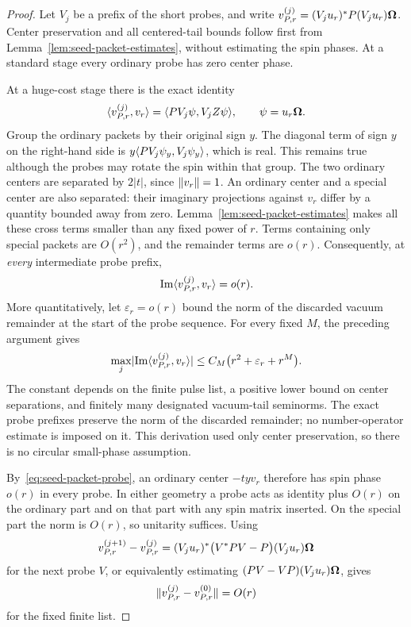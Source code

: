 \begin{proof}
Let \(V_j\) be a prefix of the short probes, and write
\(v_{P,r}^{(j)}=(V_ju_r)^*P(V_ju_r)\boldsymbol\Omega\).  Center preservation and
all centered-tail bounds follow first from
Lemma~\ref{lem:seed-packet-estimates}, without estimating the spin
phases.  At a standard stage every ordinary probe has zero center phase.

At a huge-cost stage there is the exact identity
\begin{equation}
\label{eq:seed-hermitian-diagonal}
 \langle v_{P,r}^{(j)},v_r\rangle
 =\langle PV_j\psi,V_jZ\psi\rangle,\qquad \psi=u_r\boldsymbol\Omega.
\end{equation}
Group the ordinary packets by their original sign \(y\).  The diagonal
term of sign \(y\) on the right-hand side is
\(y\langle PV_j\psi_y,V_j\psi_y\rangle\), which is real.  This remains true
although the probes may rotate the spin within that group.  The two
ordinary centers are separated by \(2|t|\), since \(\lVert v_r\rVert=1\).
An ordinary center and a special center are also separated: their
imaginary projections against \(v_r\) differ by a quantity bounded away
from zero.  Lemma~\ref{lem:seed-packet-estimates} makes all these cross
terms smaller than any fixed power of \(r\).  Terms containing only
special packets are \(O(r^2)\), and the remainder terms are \(o(r)\).
Consequently, at \emph{every} intermediate probe prefix,
\begin{equation}
\label{eq:seed-huge-imaginary}
 \operatorname{Im}\langle v_{P,r}^{(j)},v_r\rangle=o(r).
\end{equation}
More quantitatively, let \(\varepsilon_r=o(r)\) bound the norm of the
discarded vacuum remainder at the start of the probe sequence.  For
every fixed \(M\), the preceding argument gives
\begin{equation}
\label{eq:seed-huge-imaginary-modulus}
 \max_j\lvert \operatorname{Im}\langle v_{P,r}^{(j)},v_r\rangle\rvert
 \leq C_M\bigl(r^2+\varepsilon_r+r^M\bigr).
\end{equation}
The constant depends on the finite pulse list, a positive lower bound
on center separations, and finitely many designated vacuum-tail
seminorms.  The exact probe prefixes preserve the norm of the discarded
remainder; no number-operator estimate is imposed on it.
This derivation used only center preservation, so there is no circular
small-phase assumption.

By~\eqref{eq:seed-packet-probe}, an ordinary center \(-tyv_r\) therefore
has spin phase \(o(r)\) in every probe.  In either geometry a probe acts
as identity plus \(O(r)\) on the ordinary part and on that part with any
spin matrix inserted.  On the special part the norm is \(O(r)\), so
unitarity suffices.  Using
\[
 v_{P,r}^{(j+1)}-v_{P,r}^{(j)}
 =(V_ju_r)^*\bigl(V^*PV-P\bigr)(V_ju_r)\boldsymbol\Omega
\]
for the next probe \(V\), or equivalently estimating
\((PV-VP)(V_ju_r)\boldsymbol\Omega\), gives
\begin{equation}
\label{eq:seed-probe-direction-change}
 \lVert v_{P,r}^{(j)}-v_{P,r}^{(0)}\rVert=O(r)
\end{equation}
for the fixed finite list.


\end{proof}
